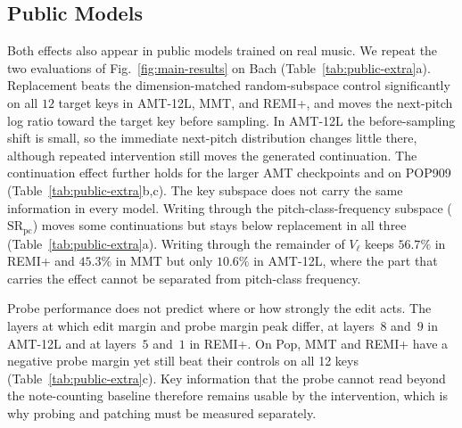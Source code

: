 \documentclass{article}
\begin{document}
\subsection{Public Models}
\label{sec:public}
Both effects also appear in public models trained on real music.
We repeat the two evaluations of Fig.~\ref{fig:main-results} on Bach (Table~\ref{tab:public-extra}a).
Replacement beats the dimension-matched random-subspace control significantly on all $12$ target keys in AMT-12L, MMT, and REMI+, and moves the next-pitch log ratio toward the target key before sampling.
In AMT-12L the before-sampling shift is small, so the immediate next-pitch distribution changes little there, although repeated intervention still moves the generated continuation.
The continuation effect further holds for the larger AMT checkpoints and on POP909 (Table~\ref{tab:public-extra}b,c).
The key subspace does not carry the same information in every model.
Writing through the pitch-class-frequency subspace ($\mathrm{SR}_{\mathrm{pc}}$) moves some continuations but stays below replacement in all three (Table~\ref{tab:public-extra}a).
Writing through the remainder of $V_\ell$ keeps $56.7\%$ in REMI+ and $45.3\%$ in MMT but only $10.6\%$ in AMT-12L, where the part that carries the effect cannot be separated from pitch-class frequency.

Probe performance does not predict where or how strongly the edit acts.
The layers at which edit margin and probe margin peak differ, at layers~$8$ and~$9$ in AMT-12L and at layers~$5$ and~$1$ in REMI+.
On Pop, MMT and REMI+ have a negative probe margin yet still beat their controls on all 12 keys (Table~\ref{tab:public-extra}c).
Key information that the probe cannot read beyond the note-counting baseline therefore remains usable by the intervention, which is why probing and patching must be measured separately.
\end{document}
